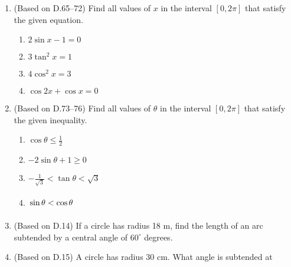 \documentclass[11pt]{article}
\newcommand{\ds}{\displaystyle}
\begin{document}
\begin{enumerate}
\begin{multicols}{4}
\begin{enumerate}
  \end{enumerate}
  \end{multicols}
\item (Based on D.65--72) Find all values of $x$ in the interval $[0,2\pi]$
  that satisfy the given equation.
  \begin{multicols}{4}
  \begin{enumerate}
  \item $\ds 2\sin x-1=0$
  \item $\ds 3\tan^2 x=1$
  \item $\ds 4\cos^2 x = 3$
  \item $\ds \cos 2x+\cos x=0$
  \end{enumerate}
  \end{multicols}
\item (Based on D.73--76) Find all values of $\theta$ in the interval $[0,2\pi]$
  that satisfy the given inequality.
  \begin{multicols}{2}
  \begin{enumerate}
  \item $\ds \cos \theta \le \frac{1}{2}$
  \item $\ds -2\sin \theta +1 \ge 0$
  \item $\ds -\frac{1}{\sqrt{3}} < \tan \theta < \sqrt{3}$
  \item $\ds \vphantom{\frac{1}{2}}\sin \theta < \cos \theta$
  \end{enumerate}
  \end{multicols}
\item (Based on D.14) If a circle has radius 18 m, find the length of an arc
  subtended by a central angle of $60^{\circ}$ degrees.
\item (Based on D.15) A circle has radius 30 cm.  What angle is subtended at

\end{enumerate}
\end{document}
